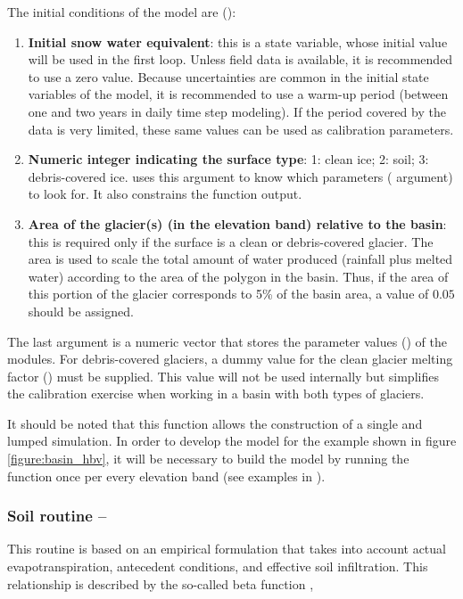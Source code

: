 The initial conditions of the model are ():

\begin{enumerate}
	\item \textbf{Initial snow water equivalent}: this is a state variable, whose initial value will be used in the first loop. Unless
	field data is available, it is recommended to use a zero value. Because uncertainties are common in the initial state 
	variables of the model, it is recommended to use a warm-up period (between one and two years in daily time step modeling).
	If the period covered by the data is very limited, these same values can be used as calibration parameters.
	\item \textbf{Numeric integer indicating the surface type}: 1: clean ice; 2: soil; 3: debris-covered ice. 
    uses this argument to know which parameters ( argument) to look for. It also constrains the function output. 
	\item \textbf{Area of the glacier(s) (in the elevation band) relative to the basin}:  this is required only if the surface
	 is a clean or debris-covered glacier. The area is used to scale the total amount of water produced (rainfall plus melted
	 water) according to the area of the polygon in the basin. Thus, if the area of this portion of the glacier corresponds to 5\%
	 of the basin area, a value of $0.05$ should be assigned.
\end{enumerate}

The last argument is a numeric vector that stores the parameter values () of the modules. For debris-covered glaciers,
a dummy value for the clean glacier melting factor () must be supplied. This value will not be used internally 
but simplifies the calibration exercise when working in a basin with both types of glaciers.

It should be noted that this function allows the construction of a single and lumped simulation. In order to develop the model 
for the example shown in figure \ref{figure:basin_hbv}, it will be necessary to build the model by running the function once per
every elevation band (see examples in ).


\subsubsection{Soil routine – }

This routine is based on an empirical formulation that takes into account actual evapotranspiration, antecedent conditions,
and effective soil infiltration. This relationship is described by the so-called beta function \citep{bergstrom:2015}, 

